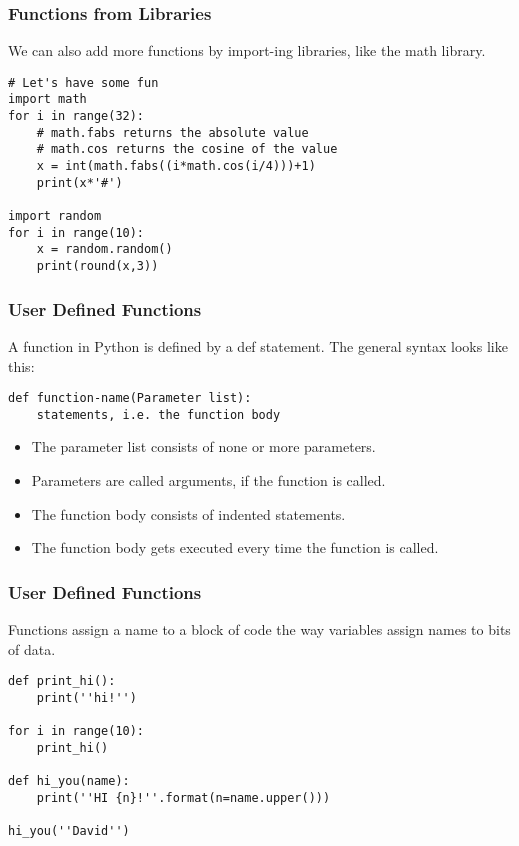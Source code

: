 \begin{frame}[fragile]\frametitle{Functions from Libraries}
We can also add more functions by import-ing libraries, like the math library. 
\begin{lstlisting}
# Let's have some fun
import math
for i in range(32):
    # math.fabs returns the absolute value
    # math.cos returns the cosine of the value
    x = int(math.fabs((i*math.cos(i/4)))+1)
    print(x*'#')
    
import random
for i in range(10):
    x = random.random()
    print(round(x,3))
\end{lstlisting}
\end{frame}


\begin{frame}[fragile]\frametitle{User Defined Functions}
A function in Python is defined by a def statement. The general syntax looks like this:
\begin{lstlisting}
def function-name(Parameter list):
    statements, i.e. the function body
\end{lstlisting}
    \begin{itemize}
    \item  The parameter list consists of none or more parameters. 
    \item Parameters are called arguments, if the function is called.
    \item The function body consists of indented statements. 
    \item The function body gets executed every time the function is called. 
    \end{itemize}
\end{frame}




\begin{frame}[fragile]\frametitle{User Defined Functions}
Functions assign a name to a block of code the way variables assign names to bits of data.
\begin{lstlisting}
def print_hi():
    print(''hi!'')

for i in range(10):
    print_hi()
    
def hi_you(name):
    print(''HI {n}!''.format(n=name.upper()))
    
hi_you(''David'')
\end{lstlisting}
\end{frame}

